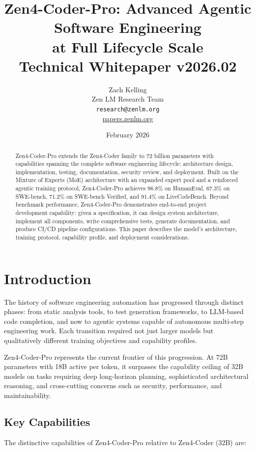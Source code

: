 \documentclass[11pt,a4paper]{article}
\title{\textbf{Zen4-Coder-Pro: Advanced Agentic Software Engineering\\
at Full Lifecycle Scale}\\[0.5em]
\large Technical Whitepaper v2026.02}
\author{Zach Kelling \\ Zen LM Research Team\\
\texttt{research@zenlm.org}\\
\href{https://papers.zenlm.org}{papers.zenlm.org}}
\date{February 2026}
\begin{document}
\maketitle

\begin{abstract}
Zen4-Coder-Pro extends the Zen4-Coder family to 72 billion parameters with capabilities spanning the complete software engineering lifecycle: architecture design, implementation, testing, documentation, security review, and deployment. Built on the Mixture of Experts (MoE) architecture with an expanded expert pool and a reinforced agentic training protocol, Zen4-Coder-Pro achieves 96.8\% on HumanEval, 67.3\% on SWE-bench, 71.2\% on SWE-bench Verified, and 91.4\% on LiveCodeBench. Beyond benchmark performance, Zen4-Coder-Pro demonstrates end-to-end project development capability: given a specification, it can design system architecture, implement all components, write comprehensive tests, generate documentation, and produce CI/CD pipeline configurations. This paper describes the model's architecture, training protocol, capability profile, and deployment considerations.
\end{abstract}

\tableofcontents
\newpage

\section{Introduction}

The history of software engineering automation has progressed through distinct phases: from static analysis tools, to test generation frameworks, to LLM-based code completion, and now to agentic systems capable of autonomous multi-step engineering work. Each transition required not just larger models but qualitatively different training objectives and capability profiles.

Zen4-Coder-Pro represents the current frontier of this progression. At 72B parameters with 18B active per token, it surpasses the capability ceiling of 32B models on tasks requiring deep long-horizon planning, sophisticated architectural reasoning, and cross-cutting concerns such as security, performance, and maintainability.

\subsection{Key Capabilities}

The distinctive capabilities of Zen4-Coder-Pro relative to Zen4-Coder (32B) are:
\end{document}
